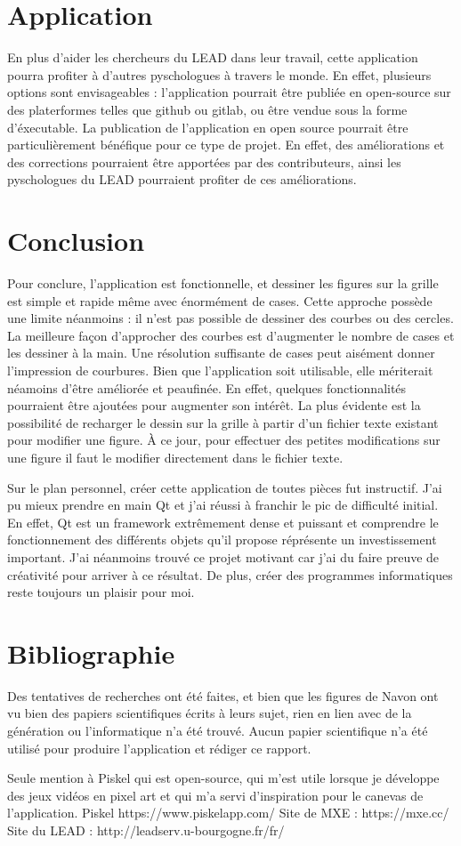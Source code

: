\documentclass{article}
\begin{document}
\section{Application}
En plus d'aider les chercheurs du LEAD dans leur travail, cette application pourra profiter à d'autres pyschologues à travers le monde. En effet, plusieurs options sont envisageables : l'application pourrait être publiée en open-source sur des platerformes telles que github ou gitlab, ou être vendue sous la forme d'éxecutable. La publication de l'application en open source pourrait être particulièrement bénéfique pour ce type de projet. En effet, des améliorations et des corrections pourraient être apportées par des contributeurs, ainsi les pyschologues du LEAD pourraient profiter de ces améliorations.

\section{Conclusion}
Pour conclure, l'application est fonctionnelle, et dessiner les figures sur la grille est simple et rapide même avec énormément de cases. Cette approche possède une limite néanmoins : il n'est pas possible de dessiner des courbes ou des cercles. La meilleure façon d'approcher des courbes est d'augmenter le nombre de cases et les dessiner à la main. Une résolution suffisante de cases peut aisément donner l'impression de courbures. Bien que l'application soit utilisable, elle mériterait néamoins d'être améliorée et peaufinée. En effet, quelques fonctionnalités pourraient être ajoutées pour augmenter son intérêt. La plus évidente est la possibilité de recharger le dessin sur la grille à partir d'un fichier texte existant pour modifier une figure. À ce jour, pour effectuer des petites modifications sur une figure il faut le modifier directement dans le fichier texte. 

Sur le plan personnel, créer cette application de toutes pièces fut instructif. J'ai pu mieux prendre en main Qt et j'ai réussi à franchir le pic de difficulté initial. En effet, Qt est un framework extrêmement dense et puissant et comprendre le fonctionnement des différents objets qu'il propose réprésente un investissement important. J'ai néanmoins trouvé ce projet motivant car j'ai du faire preuve de créativité pour arriver à ce résultat. De plus, créer des programmes informatiques reste toujours un plaisir pour moi. 

\newpage
\section{Bibliographie}
Des tentatives de recherches ont été faites, et bien que les figures de Navon ont vu bien des papiers scientifiques écrits à leurs sujet, rien en lien avec de la génération ou l'informatique n'a été trouvé. Aucun papier scientifique n'a été utilisé pour produire l'application et rédiger ce rapport.

Seule mention à Piskel qui est open-source, qui m'est utile lorsque je développe des jeux vidéos en pixel art et qui m'a servi d'inspiration pour le canevas de l'application.
Piskel https://www.piskelapp.com/
Site de MXE : https://mxe.cc/
Site du LEAD : http://leadserv.u-bourgogne.fr/fr/
\end{document}
